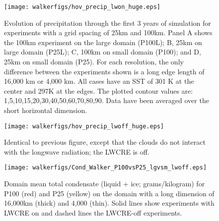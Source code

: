 \documentclass[draft]{agujournal2019}
\begin{document}
{%
\begin{figure}
  \texttt{[image: walkerfigs/hov\_precip\_lwon\_huge.eps]}
  \caption{Evolution of precipitation through the first 3 years of simulation for experiments with a grid spacing of
  25km and 100km.  Panel A shows the 100km experiment on the large domain (P100L); 
  B, 25km on large domain (P25L); C, 100km on small domain (P100); and D, 25km on small domain 
  (P25).  For each resolution, the only difference between the experiments shown is a long edge length of 
  16,000 km or 4,000 km.  All cases have an SST of 301 K at the center and 297K at the edges.  
  The plotted contour values are: 1,5,10,15,20,30,40,50,60,70,80,90.  Data have been averaged over the short horizontal dimension.}
  \label{fig:domdep}
\end{figure}

\begin{figure}
  \texttt{[image: walkerfigs/hov\_precip\_lwoff\_huge.eps]}
  \caption{Identical to previous figure, except that the clouds do not interact with the longwave radiation; the LWCRE is off.}
  \label{fig:domdep_lwoff}
\end{figure}

\begin{figure}
  \centering
       \texttt{[image: walkerfigs/Cond\_Walker\_P100vsP25\_lgvsm\_lwoff.eps]}
          \caption{Domain mean total condensate (liquid + ice; grams/kilogram) for P100 (red) and P25 (yellow) on the domain 
          with a long dimension of 16,000km (thick) and 4,000 (thin).  Solid lines show experiments with LWCRE on
          and dashed lines the LWCRE-off experiments.}
  \label{fig:TotCond_P25P100}
\end{figure}


}
\end{document}
